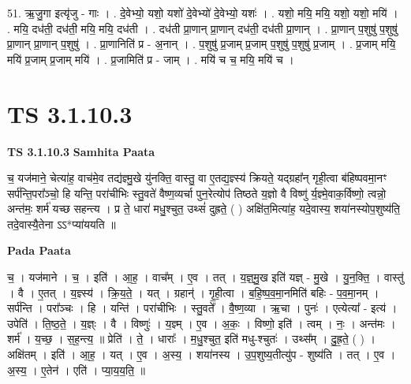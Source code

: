 \documentclass[17pt]{extarticle}
\begin{document}
51. ऋ॒जु॒गा इत्यृ॑जु - गाः । . दे॒वेभ्यो॒ यशो॒ यशो॑ दे॒वेभ्यो॑ दे॒वेभ्यो॒ यशः॑ । . यशो॒ मयि॒ मयि॒ यशो॒ यशो॒ मयि॑ । . मयि॒ दध॑ती॒ दध॑ती॒ मयि॒ मयि॒ दध॑ती । . दध॑ती प्रा॒णान् प्रा॒णान् दध॑ती॒ दध॑ती प्रा॒णान् । . प्रा॒णान् प॒शुषु॑ प॒शुषु॑ प्रा॒णान् प्रा॒णान् प॒शुषु॑ । . प्रा॒णानिति॑ प्र - अ॒नान् । . प॒शुषु॑ प्र॒जाम् प्र॒जाम् प॒शुषु॑ प॒शुषु॑ प्र॒जाम् । . प्र॒जाम् मयि॒ मयि॑ प्र॒जाम् प्र॒जाम् मयि॑ । . प्र॒जामिति॑ प्र - जाम् । . मयि॑ च च॒ मयि॒ मयि॑ च । \newline
\pagebreak
{}

\section{ TS 3.1.10.3 }

\textbf{TS 3.1.10.3 } \newline
\textbf{Samhita Paata} \newline

च॒ यज॑माने॒ चेत्या॑ह॒ वाच॑मे॒व तद्य॑ज्ञ्मु॒खे यु॑नक्ति॒ वास्तु॒ वा ए॒तद्य॒ज्ञ्स्य॑ क्रियते॒ यद्ग्रहा᳚न् गृही॒त्वा ब॑हिष्पवमा॒नꣳ सर्प॑न्ति॒परा᳚ञ्चो॒ हि यन्ति॒ परा॑चीभिः स्तु॒वते॑ वैष्ण॒व्यर्चा पुन॒रेत्योप॑ तिष्ठते य॒ज्ञो वै विष्णु॑ र्य॒ज्ञ्मे॒वाक॒र्विष्णो॒ त्वन्नो॒ अन्त॑मः॒ शर्म॑ यच्छ सहन्त्य । प्र ते॒ धारा॑ मधु॒श्चुत॒ उथ्सं॑ दुह्रते॒ ( ) अक्षि॑त॒मित्या॑ह॒ यदे॒वास्य॒ शया॑नस्योप॒शुष्य॑ति॒ तदे॒वास्यै॒तेना ऽऽ*प्या॑ययति ॥ \newline

\textbf{Pada Paata} \newline

च॒ । यज॑माने । च॒ । इति॑ । आ॒ह॒ । वाच᳚म् । ए॒व । तत् । य॒ज्ञ्॒मु॒ख इति॑ यज्ञ् - मु॒खे । यु॒न॒क्ति॒ । वास्तु॑ । वै । ए॒तत् । य॒ज्ञ्स्य॑ । क्रि॒य॒ते॒ । यत् । ग्रहान्॑ । गृ॒ही॒त्वा । ब॒हि॒ष्प॒व॒मा॒नमिति॑ बहिः - प॒व॒मा॒नम् । सर्प॑न्ति । परा᳚ञ्चः । हि । यन्ति॑ । परा॑चीभिः । स्तु॒वते᳚ । वै॒ष्ण॒व्या । ऋ॒चा । पुनः॑ । एत्येत्या᳚ - इत्य॑ । उपेति॑ । ति॒ष्ठ॒ते॒ । य॒ज्ञ्ः । वै । विष्णुः॑ । य॒ज्ञ्म् । ए॒व । अ॒कः॒ । विष्णो॒ इति॑ । त्वम् । नः॒ । अन्त॑मः । शर्म॑ । य॒च्छ॒ । स॒ह॒न्त्य॒ ॥ प्रेति॑ । ते॒ । धाराः᳚ । म॒धु॒श्चुत॒ इति॑ मधु-श्चुतः॑ । उथ्स᳚म् । दु॒ह्र॒ते॒ ( ) । अक्षि॑तम् । इति॑ । आ॒ह॒ । यत् । ए॒व । अ॒स्य॒ । शया॑नस्य । उ॒प॒शुष्य॒तीत्यु॑प - शुष्य॑ति । तत् । ए॒व । अ॒स्य॒ । ए॒तेन॑ । एति॑ । प्या॒य॒य॒ति॒ ॥  \newline
\end{document}

